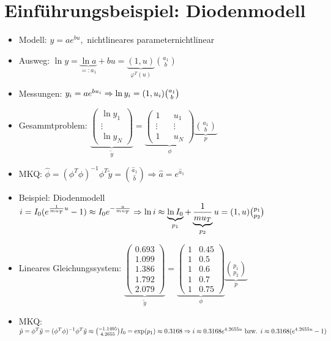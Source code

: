 \documentclass[ngerman]{tudscrreprt}
\begin{document}
\section{Einführungsbeispiel: Diodenmodell}
\begin{itemize}
\item Modell: $ y = a e^{b u}, $ nichtlineares parameternichtlinear
\item Ausweg: $ \ln y = \underbrace{\ln a}_{=:a_1} + b u = \underbrace{(1, u)}_{\varphi^T(u)} \binom{a_1}{b}$
\item Messungen: $y_i = a e^{b u_i}\\
\Rightarrow \ln y_i = (1, u_i)\binom{a_1}{b}$
\item Gesammtproblem:
$\underbrace{
\begin{pmatrix}
\ln y_1 \\
\vdots\\
\ln y_N
\end{pmatrix}}_{\tilde y} = 
\underbrace{
\begin{pmatrix}
1 && u_1\\
\vdots && \vdots\\
1 && u_N
\end{pmatrix}}_{\phi}\underbrace{\binom{a_1}{b}}_{p}
$
\item MKQ: $\hat \phi = (\phi^T \phi)^{-1} \phi^T \tilde y = \binom{\hat a_1}{\hat b} \Rightarrow \hat a = e^{\hat a_1}$
\item Beispiel: Diodenmodell $ i = I_0 (e^{\frac{1}{m u_T} u} -1) \approx I_0 e^{-\frac{u}{m u_T} }\\
\Rightarrow \ln i \approx \underbrace{\ln I_0}_{p_1} + \underbrace{ \frac{1}{m u_T}}_{p_2} u = (1, u)\binom{p_1}{p_2}
$
\item Lineares Gleichungssystem:
$\underbrace{\begin{pmatrix}
0.693\\
1.099\\
1.386\\
1.792\\
2.079
\end{pmatrix}}_{\tilde y} = \underbrace{
\begin{pmatrix}
1 & 0.45\\
1 & 0.5\\
1& 0.6\\
1& 0.7\\
1& 0.75
\end{pmatrix}}_{\phi}\underbrace{\binom{p_1}{p_2}}_{p}
$
\item MKQ: \\$\hat p = \phi^T \tilde y = (\phi^T \phi)^{-1} \phi^T \tilde y \\ \approx \binom{-1.1495}{4.2655} \\
I_0 = \exp(p_1) \approx 0.3168 \\
\Rightarrow i \approx 0.3168 e^{4.2655 u } \text{ bzw. } i \approx 0.3168 (e^{4.2655 u} -1)
$ 
\end{itemize}
\newpage
\end{document}
